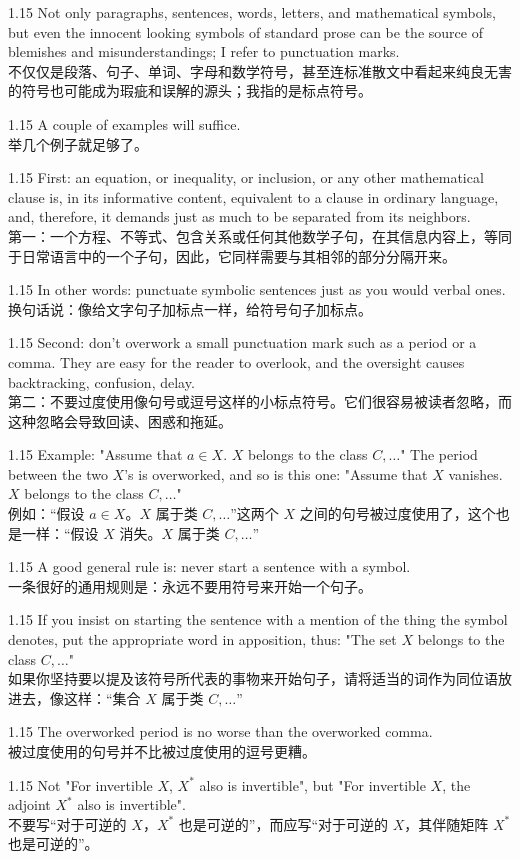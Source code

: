 \documentclass[12pt,a4paper]{article}
\newcommand{\bilingual}[2]{
    \begin{spacing}{1.15} %
        \noindent \normalsize #1 \\[-0.5ex] %
        \small \textcolor{blue!70!black}{#2} %
    \end{spacing}
    \vspace{0.8em} %
}
\begin{document}
\bilingual{Not only paragraphs, sentences, words, letters, and mathematical symbols, but even the innocent looking symbols of standard prose can be the source of blemishes and misunderstandings; I refer to punctuation marks.}
{不仅仅是段落、句子、单词、字母和数学符号，甚至连标准散文中看起来纯良无害的符号也可能成为瑕疵和误解的源头；我指的是标点符号。} %

\bilingual{A couple of examples will suffice.}
{举几个例子就足够了。} %

\bilingual{First: an equation, or inequality, or inclusion, or any other mathematical clause is, in its informative content, equivalent to a clause in ordinary language, and, therefore, it demands just as much to be separated from its neighbors.}
{第一：一个方程、不等式、包含关系或任何其他数学子句，在其信息内容上，等同于日常语言中的一个子句，因此，它同样需要与其相邻的部分分隔开来。} %

\bilingual{In other words: punctuate symbolic sentences just as you would verbal ones.}
{换句话说：像给文字句子加标点一样，给符号句子加标点。} %

\bilingual{Second: don't overwork a small punctuation mark such as a period or a comma. They are easy for the reader to overlook, and the oversight causes backtracking, confusion, delay.}
{第二：不要过度使用像句号或逗号这样的小标点符号。它们很容易被读者忽略，而这种忽略会导致回读、困惑和拖延。} %

\bilingual{Example: "Assume that $a\in X$. $X$ belongs to the class $C,\dots$" The period between the two $X$'s is overworked, and so is this one: "Assume that $X$ vanishes. $X$ belongs to the class $C,\dots$"}
{例如：“假设 $a\in X$。$X$ 属于类 $C,\dots$”这两个 $X$ 之间的句号被过度使用了，这个也是一样：“假设 $X$ 消失。$X$ 属于类 $C,\dots$”} %

\bilingual{A good general rule is: never start a sentence with a symbol.}
{一条很好的通用规则是：永远不要用符号来开始一个句子。} %

\bilingual{If you insist on starting the sentence with a mention of the thing the symbol denotes, put the appropriate word in apposition, thus: "The set $X$ belongs to the class $C,\dots$"}
{如果你坚持要以提及该符号所代表的事物来开始句子，请将适当的词作为同位语放进去，像这样：“集合 $X$ 属于类 $C,\dots$”} %

\bilingual{The overworked period is no worse than the overworked comma.}
{被过度使用的句号并不比被过度使用的逗号更糟。} %

\bilingual{Not "For invertible $X$, $X^{*}$ also is invertible", but "For invertible $X$, the adjoint $X^{*}$ also is invertible".}
{不要写“对于可逆的 $X$，$X^{*}$ 也是可逆的”，而应写“对于可逆的 $X$，其伴随矩阵 $X^{*}$ 也是可逆的”。} %
\end{document}

